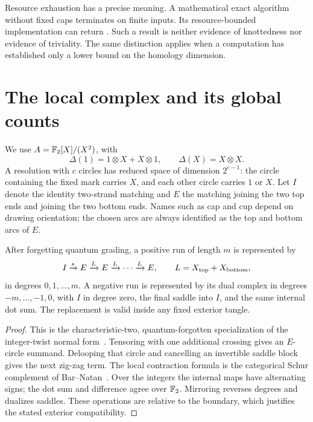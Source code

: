 Resource exhaustion has a precise meaning. A mathematical exact algorithm
without fixed caps terminates on finite inputs. Its resource-bounded
implementation can return . Such a result is neither
evidence of knottedness nor evidence of triviality. The same distinction
applies when a computation has established only a lower bound on the
homology dimension.

\section{The local complex and its global counts}\label{sec:local}

We use \(A=\mathbb F_2[X]/(X^2)\), with
\[
\Delta(1)=1\otimes X+X\otimes1,\qquad \Delta(X)=X\otimes X.
\]
A resolution with \(c\) circles has reduced space of dimension
\(2^{c-1}\): the circle containing the fixed mark carries \(X\), and each
other circle carries \(1\) or \(X\).
Let \(I\) denote the identity two-strand matching and \(E\) the matching
joining the two top ends and joining the two bottom ends. Names such as
cap and cup depend on drawing orientation; the chosen arcs are always
identified as the top and bottom arcs of \(E\).

\begin{proposition}\label{prop:normal}
After forgetting quantum grading, a positive run of length \(m\) is
represented by
\[
I\xrightarrow{s}E\xrightarrow{L}E\xrightarrow{L}\cdots
\xrightarrow{L}E,\qquad L=X_{\rm top}+X_{\rm bottom},
\]
in degrees \(0,1,\ldots,m\). A negative run is represented by its dual
complex in degrees \(-m,\ldots,-1,0\), with \(I\) in degree zero, the final
saddle into \(I\), and the same internal dot sum.
The replacement is valid inside any fixed exterior tangle.
\end{proposition}

\begin{proof}
This is the characteristic-two, quantum-forgotten specialization of the
integer-twist normal form~\cite[Proposition 4.1]{thompson}. Tensoring with
one additional crossing gives an \(E\)-circle summand. Delooping that circle
and cancelling an invertible saddle block gives the next zig-zag term.
The local contraction formula is the categorical Schur complement of
Bar--Natan~\cite{bn07}. Over the integers the internal maps have alternating
signs; the dot sum and difference agree over \(\mathbb F_2\). Mirroring reverses
degrees and dualizes saddles. These operations are relative to the
boundary, which justifies the stated exterior compatibility.
\end{proof}

